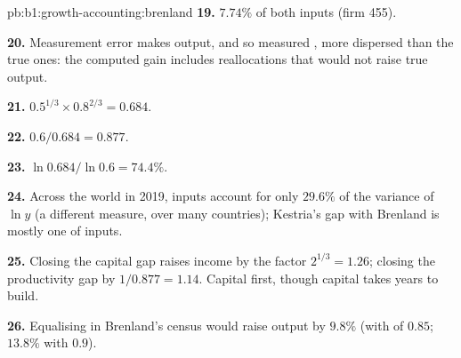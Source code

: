 \begin{solution}{pb:b1:growth-accounting:brenland}
\textbf{19.} $7.74\%$ of both inputs (firm 455).

\textbf{20.} Measurement error makes output, and so measured , more dispersed than the true ones: the computed gain includes
reallocations that would not raise true output.

\textbf{21.} $0.5^{1/3} \times 0.8^{2/3} = 0.684$.

\textbf{22.} $0.6/0.684 = 0.877$.

\textbf{23.} $\ln 0.684/\ln 0.6 = 74.4\%$.

\textbf{24.} Across the world in 2019, inputs account for only $29.6\%$ of the
variance of $\ln y$ (a different measure, over many countries); Kestria's gap
with Brenland is mostly one of inputs.

\textbf{25.} Closing the capital gap raises income by the factor
$2^{1/3} = 1.26$; closing the productivity gap by $1/0.877 = 1.14$. Capital first,
though capital takes years to build.

\textbf{26.} Equalising  in Brenland's census would raise
output by $9.8\%$ (with  of $0.85$; $13.8\%$ with $0.9$).
\end{solution}
